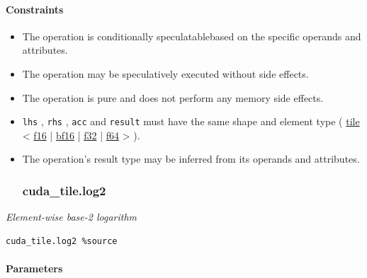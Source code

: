 \documentclass{article}
\begin{document}
\paragraph{Constraints}

\begin{itemize}
\item The operation is conditionally speculatablebased on the specific operands and attributes.
\item The operation may be speculatively executed without side effects.
\item The operation is pure and does not perform any memory side effects.
\item \texttt{lhs} , \texttt{rhs} , \texttt{acc} and \texttt{result} must have the same shape and element type ( \href{https://docs.nvidia.com/cuda/tile-ir/latest/sections/types.html#type-tile}{tile} < \href{https://docs.nvidia.com/cuda/tile-ir/latest/sections/types.html#subsection-element-types}{f16} | \href{https://docs.nvidia.com/cuda/tile-ir/latest/sections/types.html#subsection-element-types}{bf16} | \href{https://docs.nvidia.com/cuda/tile-ir/latest/sections/types.html#subsection-element-types}{f32} | \href{https://docs.nvidia.com/cuda/tile-ir/latest/sections/types.html#subsection-element-types}{f64} > ).
\item The operation's result type may be inferred from its operands and attributes.


\subsubsection{cuda\_tile.log2}

\end{itemize}
\textit{Element-wise base-2 logarithm}


\begin{lstlisting}
cuda_tile.log2 %source
\end{lstlisting}

\paragraph{Parameters}
\end{document}
